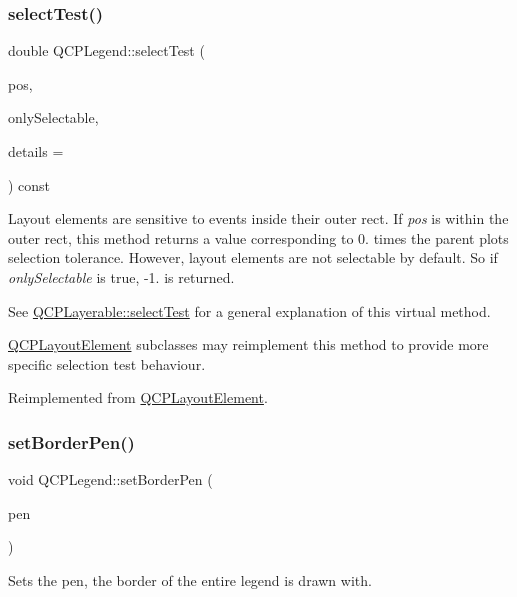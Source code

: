 \subsubsection{\texorpdfstring{select\+Test()}{selectTest()}}
{\footnotesize\ttfamily double Q\+C\+P\+Legend\+::select\+Test (\begin{DoxyParamCaption}\item[{const Q\+PointF \&}]{pos,  }\item[{bool}]{only\+Selectable,  }\item[{Q\+Variant $\ast$}]{details = {} }\end{DoxyParamCaption}) const\hspace{0.3cm}{\ttfamily [virtual]}}

Layout elements are sensitive to events inside their outer rect. If {\itshape pos} is within the outer rect, this method returns a value corresponding to 0. times the parent plot\textquotesingle{}s selection tolerance. However, layout elements are not selectable by default. So if {\itshape only\+Selectable} is true, -\/1. is returned.

See \hyperlink{class_q_c_p_layerable_a04db8351fefd44cfdb77958e75c6288e}{Q\+C\+P\+Layerable\+::select\+Test} for a general explanation of this virtual method.

\hyperlink{class_q_c_p_layout_element}{Q\+C\+P\+Layout\+Element} subclasses may reimplement this method to provide more specific selection test behaviour. 

Reimplemented from \hyperlink{class_q_c_p_layout_element_a0b96ae0d7bcfa6e38188fcb1e73e143f}{Q\+C\+P\+Layout\+Element}.

\hypertarget{class_q_c_p_legend_a866a9e3f5267de7430a6c7f26a61db9f}{}\label{class_q_c_p_legend_a866a9e3f5267de7430a6c7f26a61db9f} 
\subsubsection{\texorpdfstring{set\+Border\+Pen()}{setBorderPen()}}
{\footnotesize\ttfamily void Q\+C\+P\+Legend\+::set\+Border\+Pen (\begin{DoxyParamCaption}\item[{const Q\+Pen \&}]{pen }\end{DoxyParamCaption})}

Sets the pen, the border of the entire legend is drawn with. \hypertarget{class_q_c_p_legend_a497bbcd38baa3598c08e2b3f48103f23}{}\label{class_q_c_p_legend_a497bbcd38baa3598c08e2b3f48103f23} 
